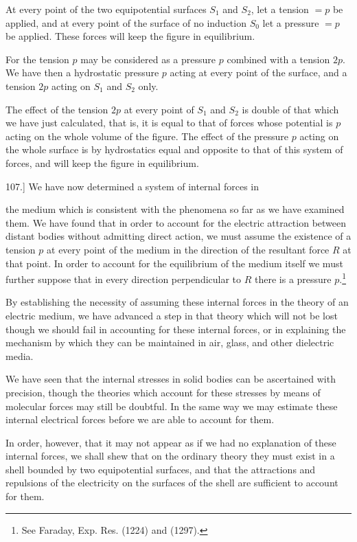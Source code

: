 \documentclass[11pt,a4paper]{article}
\begin{document}
At every point of the two equipotential surfaces $S_1$ and $S_2$, let a tension $=p$ be applied, and at every point of the surface of no induction $S_0$ let a pressure $=p$ be applied. These forces will keep the figure in equilibrium.

For the tension $p$ may be considered as a pressure $p$ combined with a tension $2p$. We have then a hydrostatic pressure $p$ acting at every point of the surface, and a tension $2p$ acting on $S_1$ and $S_2$ only.

The effect of the tension $2p$ at every point of $S_1$ and $S_2$ is double of that which we have just calculated, that is, it is equal to that of forces whose potential is $p$ acting on the whole volume of the figure. The effect of the pressure $p$ acting on the whole surface is by hydrostatics equal and opposite to that of this system of forces, and will keep the figure in equilibrium.

107.] We have now determined a system of internal forces in

the medium which is consistent with the phenomena so far as we have examined them. We have found that in order to account for the electric attraction between distant bodies without admitting direct action, we must assume the existence of a tension $p$ at every point of the medium in the direction of the resultant force $R$ at that point. In order to account for the equilibrium of the medium itself we must further suppose that in every direction perpendicular to $R$ there is a pressure $p$.\footnote[1]{See Faraday, Exp. Res. (1224) and (1297).}

By establishing the necessity of assuming these internal forces in the theory of an electric medium, we have advanced a step in that theory which will not be lost though we should fail in accounting for these internal forces, or in explaining the mechanism by which they can be maintained in air, glass, and other dielectric media.

We have seen that the internal stresses in solid bodies can be ascertained with precision, though the theories which account for these stresses by means of molecular forces may still be doubtful. In the same way we may estimate these internal electrical forces before we are able to account for them.

In order, however, that it may not appear as if we had no explanation of these internal forces, we shall shew that on the ordinary theory they must exist in a shell bounded by two equipotential surfaces, and that the attractions and repulsions of the electricity on the surfaces of the shell are sufficient to account for them.
\end{document}
